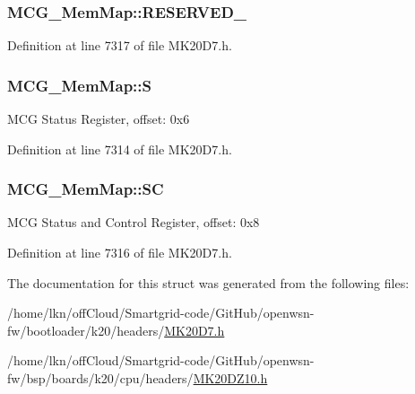 \subsubsection[{\texorpdfstring{R\+E\+S\+E\+R\+V\+E\+D\+\_\+1}{RESERVED_1}}]{ M\+C\+G\+\_\+\+Mem\+Map\+::\+R\+E\+S\+E\+R\+V\+E\+D\+\_}\hypertarget{struct_m_c_g___mem_map_a7c3635946afd5f532fe4d46b340c4f4e}{}\label{struct_m_c_g___mem_map_a7c3635946afd5f532fe4d46b340c4f4e}


Definition at line 7317 of file M\+K20\+D7.\+h.

\subsubsection[{\texorpdfstring{S}{S}}]{ M\+C\+G\+\_\+\+Mem\+Map\+::S}\hypertarget{struct_m_c_g___mem_map_a65ee0333e0d5c462c7dd8c2402bf93be}{}\label{struct_m_c_g___mem_map_a65ee0333e0d5c462c7dd8c2402bf93be}
M\+CG Status Register, offset\+: 0x6 

Definition at line 7314 of file M\+K20\+D7.\+h.

\subsubsection[{\texorpdfstring{SC}{SC}}]{ M\+C\+G\+\_\+\+Mem\+Map\+::\+SC}\hypertarget{struct_m_c_g___mem_map_aeff584aa52340d7c66dc06789ad05310}{}\label{struct_m_c_g___mem_map_aeff584aa52340d7c66dc06789ad05310}
M\+CG Status and Control Register, offset\+: 0x8 

Definition at line 7316 of file M\+K20\+D7.\+h.



The documentation for this struct was generated from the following files\+:\begin{DoxyCompactItemize}
\item 
/home/lkn/off\+Cloud/\+Smartgrid-\/code/\+Git\+Hub/openwsn-\/fw/bootloader/k20/headers/\hyperlink{bootloader_2k20_2headers_2_m_k20_d7_8h}{M\+K20\+D7.\+h}\item 
/home/lkn/off\+Cloud/\+Smartgrid-\/code/\+Git\+Hub/openwsn-\/fw/bsp/boards/k20/cpu/headers/\hyperlink{_m_k20_d_z10_8h}{M\+K20\+D\+Z10.\+h}\end{DoxyCompactItemize}
